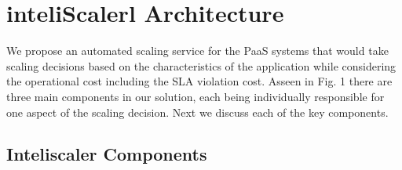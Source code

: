 \section{inteliScalerl Architecture}
We propose an automated scaling service for the PaaS systems that would take scaling decisions based on the characteristics of the application while considering the operational cost including the SLA violation cost. Asseen in Fig. 1 there are three main components in our solution, each being individually responsible for one aspect of the scaling decision. Next we discuss each of the key components.\\

\subsection{Inteliscaler Components}